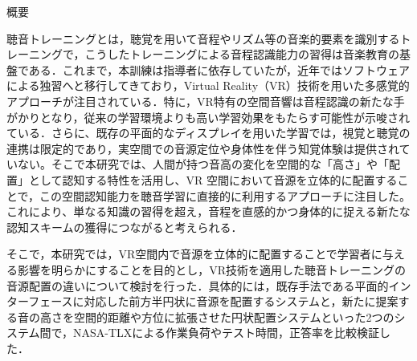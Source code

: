 \begin{center}
\Large{概要}
\end{center}

聴音トレーニングとは，聴覚を用いて音程やリズム等の音楽的要素を識別するトレーニングで，こうしたトレーニングによる音程認識能力の習得は音楽教育の基盤である．これまで，本訓練は指導者に依存していたが，近年ではソフトウェアによる独習へと移行してきており，Virtual Reality（VR）技術を用いた多感覚的アプローチが注目されている．特に，VR特有の空間音響は音程認識の新たな手がかりとなり，従来の学習環境よりも高い学習効果をもたらす可能性が示唆されている．さらに、既存の平面的なディスプレイを用いた学習では，視覚と聴覚の連携は限定的であり，実空間での音源定位や身体性を伴う知覚体験は提供されていない。そこで本研究では、人間が持つ音高の変化を空間的な「高さ」や「配置」として認知する特性を活用し、VR 空間において音源を立体的に配置することで，この空間認知能力を聴音学習に直接的に利用するアプローチに注目した。これにより、単なる知識の習得を超え，音程を直感的かつ身体的に捉える新たな認知スキームの獲得につながると考えられる．


そこで，本研究では，VR空間内で音源を立体的に配置することで学習者に与える影響を明らかにすることを目的とし，VR技術を適用した聴音トレーニングの音源配置の違いについて検討を行った．具体的には，既存手法である平面的インターフェースに対応した前方半円状に音源を配置するシステムと，新たに提案する音の高さを空間的距離や方位に拡張させた円状配置システムといった2つのシステム間で，NASA-TLXによる作業負荷やテスト時間，正答率を比較検証した．
